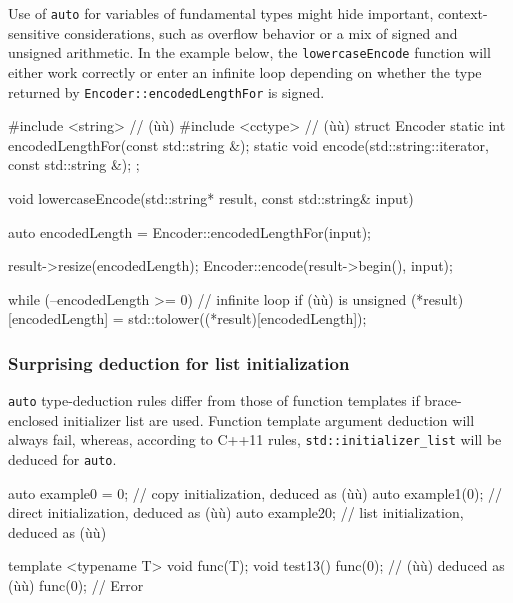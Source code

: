 Use of \lstinline!auto! for variables of fundamental types might hide
important, context-sensitive considerations, such as overflow behavior
or a mix of signed and unsigned arithmetic. In the example below, the
\lstinline!lowercaseEncode! function will either work correctly or enter an
infinite loop depending on whether the type returned by
\lstinline!Encoder::encodedLengthFor! is signed.

\begin{emcppshiddenlisting}[emcppsbatch=e20]
#include <string>  // (ù{}ù)
#include <cctype>  // (ù{}ù)
struct Encoder {
    static int encodedLengthFor(const std::string &);
    static void encode(std::string::iterator, const std::string &);
};
\end{emcppshiddenlisting}
\begin{emcppslisting}[emcppsbatch=e20]
void lowercaseEncode(std::string* result, const std::string& input)
{
    auto encodedLength = Encoder::encodedLengthFor(input);

    result->resize(encodedLength);
    Encoder::encode(result->begin(), input);

    while (--encodedLength >= 0)  // infinite loop if (ù{}ù) is unsigned
    {
        (*result)[encodedLength] = std::tolower((*result)[encodedLength]);
    }
}
\end{emcppslisting}
    

\subsubsection[Surprising deduction for list initialization]{Surprising deduction for list initialization}\label{surprising-deduction-for-list-initialization}

\lstinline!auto! type-deduction rules differ from those of function
templates if brace-enclosed initializer list are used. Function template
argument deduction will always fail, whereas, according to C++11 rules,
\lstinline!std::initializer_list! will be deduced for \lstinline!auto!.

\begin{emcppslisting}
auto example0 = 0; // copy initialization, deduced as (ù{}ù)
auto example1(0);  // direct initialization, deduced as (ù{}ù)
auto example2{0};  // list initialization, deduced as (ù{}ù)

template <typename T> void func(T);
void test13()
{
    func(0);   // (ù{}ù) deduced as (ù{}ù)
    func({0}); // Error
}
\end{emcppslisting}
    
